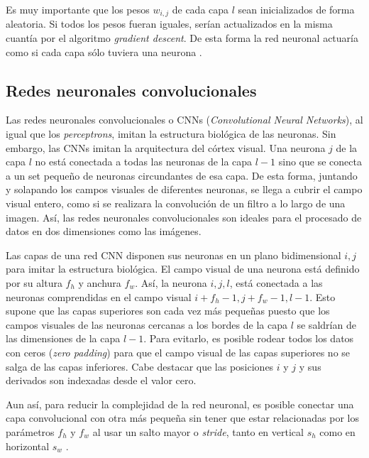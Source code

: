 Es muy importante que los pesos $w_{i,j}$ de cada capa $l$ sean inicializados de forma aleatoria. Si todos los pesos fueran iguales, serían actualizados en la misma cuantía por el algoritmo \textit{gradient descent}. De esta forma la red neuronal actuaría como si cada capa sólo tuviera una neurona \cite{machinelearningbook, rumelhart1985}.

\subsection{Redes neuronales convolucionales}
Las redes neuronales convolucionales o CNNs (\textit{Convolutional Neural Networks}), al igual que los \textit{perceptrons}, imitan la estructura biológica de las neuronas. Sin embargo, las CNNs imitan la arquitectura del córtex visual. Una neurona $j$ de la capa $l$ no está conectada a todas las neuronas de la capa $l-1$ sino que se conecta a un set pequeño de neuronas circundantes de esa capa. De esta forma, juntando y solapando los campos visuales de diferentes neuronas, se llega a cubrir el campo visual entero, como si se realizara la convolución de un filtro a lo largo de una imagen. Así, las redes neuronales convolucionales son ideales para el procesado de datos en dos dimensiones como las imágenes.

Las capas de una red CNN disponen sus neuronas en un plano bidimensional $i,j$ para imitar la estructura biológica. El campo visual de una neurona está definido por su altura $f_h$ y anchura $f_w$. Así, la neurona $i,j,l$, está conectada a las neuronas comprendidas en el campo visual $i+f_h-1, j+f_w-1,l-1$. Esto supone que las capas superiores son cada vez más pequeñas puesto que los campos visuales de las neuronas cercanas a los bordes de la capa $l$ se saldrían de las dimensiones de la capa $l-1$. Para evitarlo, es posible rodear todos los datos con ceros (\textit{zero padding}) para que el campo visual de las capas superiores no se salga de las capas inferiores. Cabe destacar que las posiciones $i$ y $j$ y sus derivados son indexadas desde el valor cero.

Aun así, para reducir la complejidad de la red neuronal, es posible conectar una capa convolucional con otra más pequeña sin tener que estar relacionadas por los parámetros $f_h$ y $f_w$ al usar un salto mayor o \textit{stride}, tanto en vertical $s_h$ como en horizontal $s_w$ \cite{machinelearningbook, cnn, cnn1}.

